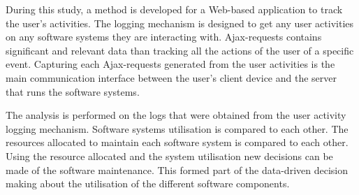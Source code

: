 During this study, a method is developed for a Web-based application to track the
user's activities. The logging mechanism is designed to get any user activities
on any software systems they are interacting with. Ajax-requests contains
significant and relevant data than tracking all the actions of the user of a
specific event. Capturing each Ajax-requests generated from the user activities
is the main communication interface between the user's client device and the
server that runs the software systems.

The analysis is performed on the logs that were obtained from the user activity
logging mechanism. Software systems utilisation is compared to each other. The
resources allocated to maintain each software system is compared to each other.
Using the resource allocated and the system utilisation new decisions can be
made of the software maintenance. This formed part of the data-driven decision making
about the utilisation of the different software components.